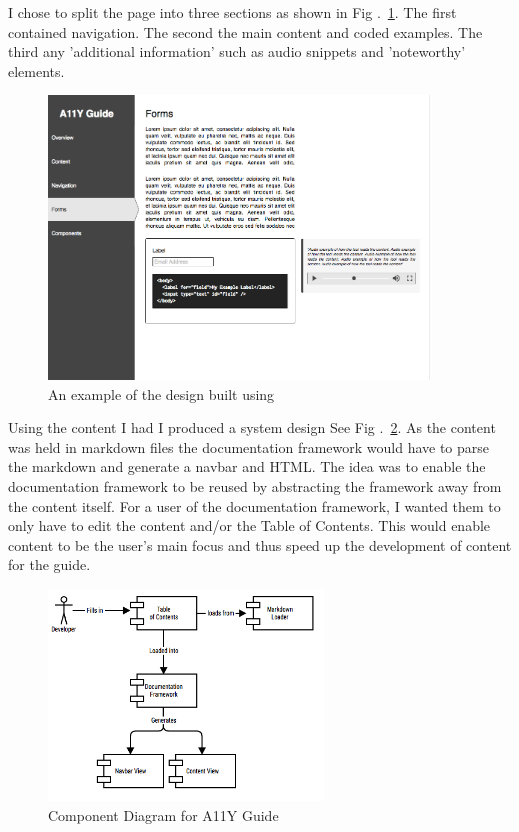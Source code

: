 I chose to split the page into three sections as shown in Fig
.~\ref{fig:a11y_guide_design}. The first contained navigation. The second the main
content and coded examples. The third any 'additional information' such as
audio snippets and 'noteworthy' elements.

\begin{figure}[H]
\centering
\includegraphics[width=0.9\textwidth]{figures/a11y_guide_design}
\captionsetup{justification=centering}
\caption{An example of the design built using \cite*{Moqups}
\label{fig:a11y_guide_design}}
\end{figure}

Using the content I had I produced a system design See Fig
.~\ref{fig:allycomponent}. As the content was held in markdown files the
documentation framework would have to parse the markdown and generate a
navbar and HTML. The idea was to enable the documentation framework to be
reused by abstracting the framework away from the content itself. For a user
of the documentation framework, I wanted them to only have to edit the
content and/or the Table of Contents. This would enable content to be the
user's main focus and thus speed up the development of content for the guide.

\begin{figure}[H]
\centering
\includegraphics[width=0.65\textwidth]{figures/documentation_design}
\captionsetup{justification=centering}
\caption{Component Diagram for A11Y Guide
\label{fig:allycomponent}}
\end{figure}

